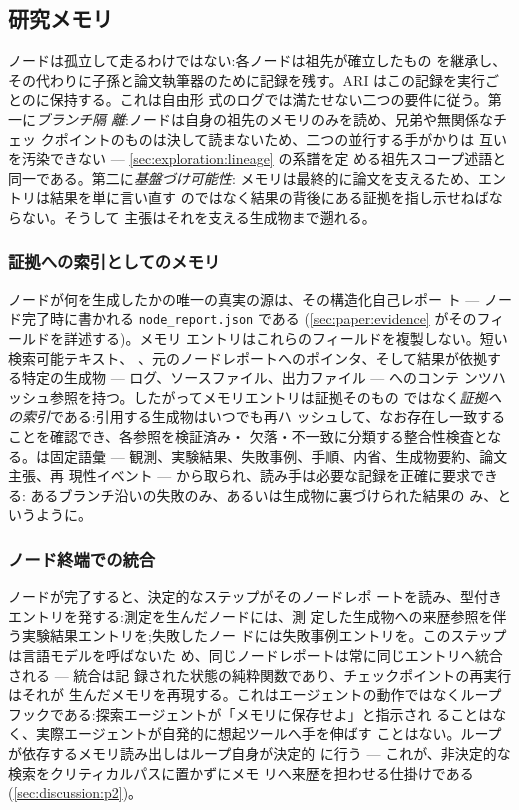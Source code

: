 \subsection{研究メモリ}\label{sec:exploration:memory}

ノードは孤立して走るわけではない:各ノードは祖先が確立したもの
を継承し、その代わりに子孫と論文執筆器のために記録を残す。ARI
はこの記録を実行ごとのに保持する。これは自由形
式のログでは満たせない二つの要件に従う。第一に\emph{ブランチ隔
離}:ノードは自身の祖先のメモリのみを読め、兄弟や無関係なチェッ
クポイントのものは決して読まないため、二つの並行する手がかりは
互いを汚染できない — \cref{sec:exploration:lineage} の系譜を定
める祖先スコープ述語と同一である。第二に\emph{基盤づけ可能性}:
メモリは最終的に論文を支えるため、エントリは結果を単に言い直す
のではなく結果の背後にある証拠を指し示せねばならない。そうして
主張はそれを支える生成物まで遡れる。

\subsubsection*{証拠への索引としてのメモリ}

ノードが何を生成したかの唯一の真実の源は、その構造化自己レポー
ト — ノード完了時に書かれる \texttt{node\_report.json} である
(\cref{sec:paper:evidence} がそのフィールドを詳述する)。メモリ
エントリはこれらのフィールドを複製しない。短い検索可能テキスト、
、元のノードレポートへのポインタ、そして結果が依拠す
る特定の生成物 — ログ、ソースファイル、出力ファイル — へのコンテ
ンツハッシュ参照を持つ。したがってメモリエントリは証拠そのもの
ではなく\emph{証拠への索引}である:引用する生成物はいつでも再ハ
ッシュして、なお存在し一致することを確認でき、各参照を検証済み・
欠落・不一致に分類する整合性検査となる。は固定語彙 —
観測、実験結果、失敗事例、手順、内省、生成物要約、論文主張、再
現性イベント — から取られ、読み手は必要な記録を正確に要求できる:
あるブランチ沿いの失敗のみ、あるいは生成物に裏づけられた結果の
み、というように。

\subsubsection*{ノード終端での統合}

ノードが完了すると、決定的なステップがそのノードレポ
ートを読み、型付きエントリを発する:測定を生んだノードには、測
定した生成物への来歴参照を伴う実験結果エントリを;失敗したノー
ドには失敗事例エントリを。このステップは言語モデルを呼ばないた
め、同じノードレポートは常に同じエントリへ統合される — 統合は記
録された状態の純粋関数であり、チェックポイントの再実行はそれが
生んだメモリを再現する。これはエージェントの動作ではなくループ
フックである:探索エージェントが「メモリに保存せよ」と指示され
ることはなく、実際エージェントが自発的に想起ツールへ手を伸ばす
ことはない。ループが依存するメモリ読み出しはループ自身が決定的
に行う — これが、非決定的な検索をクリティカルパスに置かずにメモ
リへ来歴を担わせる仕掛けである(\cref{sec:discussion:p2})。

